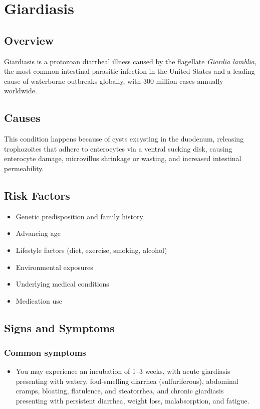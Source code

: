 \chapter{Giardiasis}
\label{sec:Giardiasis}

\section{Overview}
Giardiasis is a protozoan diarrheal illness caused by the flagellate \textit{Giardia lamblia}, the most common intestinal parasitic infection in the United States and a leading cause of waterborne outbreaks globally, with 300 million cases annually worldwide.
\section{Causes}
This condition happens because of cysts excysting in the duodenum, releasing trophozoites that adhere to enterocytes via a ventral sucking disk, causing enterocyte damage, microvillus shrinkage or wasting, and increased intestinal permeability.     
\section{Risk Factors}

\begin{itemize}[noitemsep]
  \item Genetic predisposition and family history
  \item Advancing age
  \item Lifestyle factors (diet, exercise, smoking, alcohol)
  \item Environmental exposures
  \item Underlying medical conditions
  \item Medication use
\end{itemize}
\section{Signs and Symptoms}

\subsection{Common symptoms}
\begin{itemize}[noitemsep]
  \item You may experience an incubation of 1--3 weeks, with acute giardiasis presenting with watery, foul-smelling diarrhea (sulfuriferous), abdominal cramps, bloating, flatulence, and steatorrhea, and chronic giardiasis presenting with persistent diarrhea, weight loss, malabsorption, and fatigue. 
  \end{itemize}

